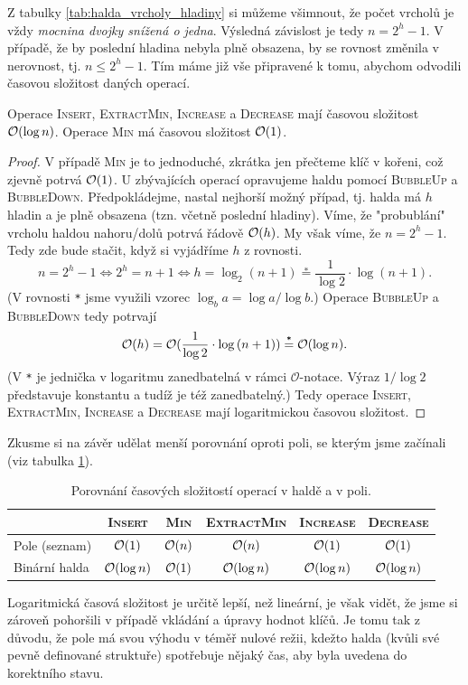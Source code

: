Z tabulky \ref{tab:halda_vrcholy_hladiny} si můžeme všimnout, že počet vrcholů je vždy \emph{mocnina dvojky snížená o jedna}. Výsledná závislost je tedy $n=2^h-1$. V případě, že by poslední hladina nebyla plně obsazena, by se rovnost změnila v nerovnost, tj. $n\leqslant2^h-1$. Tím máme již vše připravené k tomu, abychom odvodili časovou složitost daných operací.
\begin{theorem}
    Operace \textsc{Insert}, \textsc{ExtractMin}, \textsc{Increase} a \textsc{Decrease} mají časovou složitost $\mathcal{O}(\log{n})$. Operace \textsc{Min} má časovou složitost $\mathcal{O}(1)$.
\end{theorem}
\begin{proof}
    V případě \textsc{Min} je to jednoduché, zkrátka jen přečteme klíč v kořeni, což zjevně potrvá $\mathcal{O}(1)$. U zbývajících operací opravujeme haldu pomocí \textsc{BubbleUp} a \textsc{BubbleDown}. Předpokládejme, nastal nejhorší možný případ, tj. halda má $h$ hladin a je plně obsazena (tzn. včetně poslední hladiny). Víme, že "probublání" vrcholu haldou nahoru/dolů potrvá řádově $\mathcal{O}(h)$. My však víme, že $n=2^h-1$. Tedy zde bude stačit, když si vyjádříme $h$ z rovnosti.
    \[n=2^h-1 \iff 2^h=n+1 \iff h=\log_2{(n+1)}\stackrel{\texttt{*}}{=}\dfrac{1}{\log{2}}\cdot\log{(n+1)}.\]
    (V rovnosti \texttt{*} jsme využili vzorec $\log_b{a}=\log{a}/\log{b}$.) Operace \textsc{BubbleUp} a \textsc{BubbleDown} tedy potrvají
    \[\mathcal{O}(h)=\mathcal{O}(\dfrac{1}{\log{2}}\cdot\log{(n+1)})\stackrel{\texttt{*}}{=}\mathcal{O}(\log{n}).\]
    (V \texttt{*} je jednička v logaritmu zanedbatelná v rámci $\mathcal{O}$-notace. Výraz $1/\log{2}$ představuje konstantu a tudíž je též zanedbatelný.) Tedy operace \textsc{Insert}, \textsc{ExtractMin}, \textsc{Increase} a \textsc{Decrease} mají logaritmickou časovou složitost.
\end{proof}
Zkusme si na závěr udělat menší porovnání oproti poli, se kterým jsme začínali (viz tabulka \ref{tab:halda_pole_operace}).
\begin{table}[h]
    \centering
    \begin{tabular}{l|ccccc}
                  & \textsc{Insert} & \textsc{Min} & \textsc{ExtractMin} & \textsc{Increase} & \textsc{Decrease} \\\hline
    Pole (seznam) & $\mathcal{O}(1)$                       & $\mathcal{O}(n)$                    & $\mathcal{O}(n)$                           & $\mathcal{O}(1)$                         & $\mathcal{O}(1)$                         \\
    Binární halda & $\mathcal{O}(\log{n})$                 & $\mathcal{O}(1)$                    & $\mathcal{O}(\log{n})$                     & $\mathcal{O}(\log{n})$                   & $\mathcal{O}(\log{n})$                  
    \end{tabular}
    \caption{Porovnání časových složitostí operací v haldě a v poli.}
    \label{tab:halda_pole_operace}
\end{table}
Logaritmická časová složitost je určitě lepší, než lineární, je však vidět, že jsme si zároveň pohoršili v případě vkládání a úpravy hodnot klíčů. Je tomu tak z důvodu, že pole má svou výhodu v téměř nulové režii, kdežto halda (kvůli své pevně definované struktuře) spotřebuje nějaký čas, aby byla uvedena do korektního stavu.

